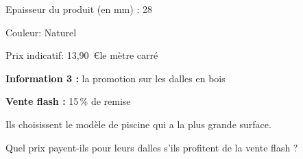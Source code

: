 Epaisseur du produit (en mm) : 28

Couleur: Naturel

Prix indicatif: 13,90~\euro le mètre carré

\medskip

\textbf{Information 3 :} la promotion sur les dalles en bois

\begin{center}
\textbf{Vente flash :} 15\,\% de remise
\end{center}

Ils choisissent le modèle de piscine qui a la plus grande surface.

Quel prix payent-ils pour leurs dalles s'ils profitent de la vente flash ?
\vspace{0.25cm}

